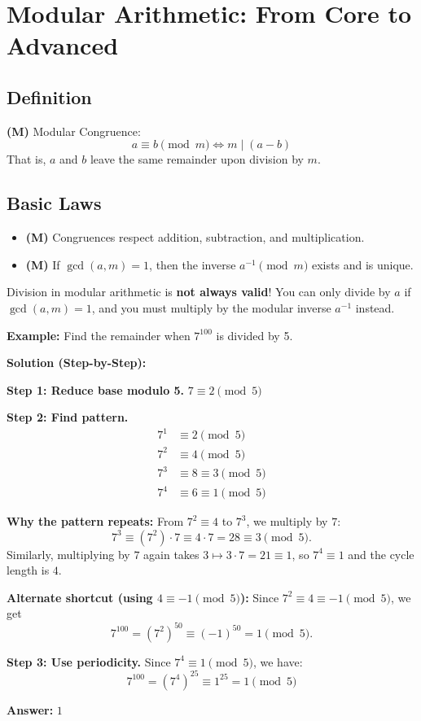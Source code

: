 \documentclass[12pt]{extarticle}
\begin{document}
\section{Modular Arithmetic: From Core to Advanced}

\subsection*{Definition}
\begin{theorembox}
\textbf{(M)} Modular Congruence:
\[
a\equiv b \pmod m \iff m \mid (a-b)
\]
That is, $a$ and $b$ leave the same remainder upon division by $m$.
\end{theorembox}

\subsection*{Basic Laws}
\begin{itemize}
\item \textbf{(M)} Congruences respect addition, subtraction, and multiplication.
\item \textbf{(M)} If $\gcd(a,m)=1$, then the inverse $a^{-1}\pmod m$ exists and is unique.
\end{itemize}

\begin{warningbox}
Division in modular arithmetic is \textbf{not always valid}! You can only divide by $a$ if $\gcd(a,m) = 1$, and you must multiply by the modular inverse $a^{-1}$ instead.
\end{warningbox}

\begin{examplebox}
\textbf{Example:} Find the remainder when $7^{100}$ is divided by 5.

\textbf{Solution (Step-by-Step):}

\textbf{Step 1: Reduce base modulo 5.} $7 \equiv 2 \pmod{5}$

\textbf{Step 2: Find pattern.}
\begin{align*}
7^1 &\equiv 2 \pmod{5} \\
7^2 &\equiv 4 \pmod{5} \\
7^3 &\equiv 8 \equiv 3 \pmod{5} \\
7^4 &\equiv 6 \equiv 1 \pmod{5}
\end{align*}

	\textbf{Why the pattern repeats:} From $7^2\equiv 4$ to $7^3$, we multiply by $7$:
\[
7^3 \equiv (7^2)\cdot 7 \equiv 4\cdot 7 = 28 \equiv 3 \pmod{5}.
\]
Similarly, multiplying by $7$ again takes $3\mapsto 3\cdot 7=21\equiv 1$, so $7^4\equiv1$ and the cycle length is $4$.

	\textbf{Alternate shortcut (using $4\equiv -1\pmod5$):}
Since $7^2\equiv 4\equiv -1\pmod5$, we get
\[
7^{100} = (7^2)^{50} \equiv (-1)^{50} = 1 \pmod{5}.
\]

\textbf{Step 3: Use periodicity.} Since $7^4 \equiv 1 \pmod{5}$, we have:
\[
7^{100} = (7^4)^{25} \equiv 1^{25} = 1 \pmod{5}
\]

\textbf{Answer:} $\boxed{1}$
\end{examplebox}
\end{document}
